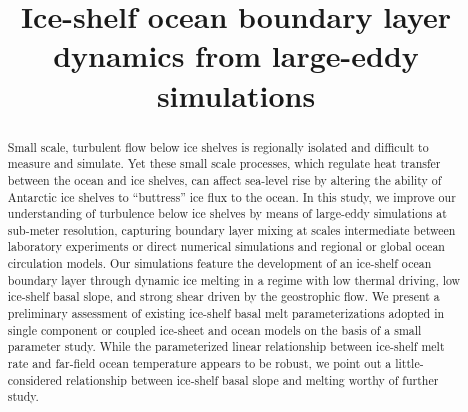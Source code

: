 \documentclass[tc, manuscript]{copernicus}
\begin{document}
\title{Ice-shelf ocean boundary layer dynamics from large-eddy simulations}






\received{}
\pubdiscuss{}
\revised{}
\accepted{}
\published{}


\maketitle

\begin{abstract}
Small scale, turbulent flow below ice shelves is regionally isolated and difficult to measure and simulate.  Yet these small scale processes, which regulate heat transfer between the ocean and ice shelves, can affect sea-level rise by altering the ability of Antarctic ice shelves to “buttress” ice flux to the ocean. In this study, we improve our understanding of turbulence below ice shelves by means of large-eddy simulations at sub-meter resolution, capturing boundary layer mixing at scales intermediate between laboratory experiments or direct numerical simulations and regional or global ocean circulation models. Our simulations feature the development of an ice-shelf ocean boundary layer through dynamic ice melting in a regime with low thermal driving, low ice-shelf basal slope, and strong shear driven by the geostrophic flow. 
We present a preliminary assessment of existing ice-shelf basal melt parameterizations adopted in single component or coupled ice-sheet and ocean models on the basis of a small parameter study. While the parameterized linear relationship between ice-shelf melt rate and far-field ocean temperature appears to be robust, we point out a little-considered relationship between ice-shelf basal slope and melting worthy of further study.
\end{abstract}

\introduction
\end{document}
